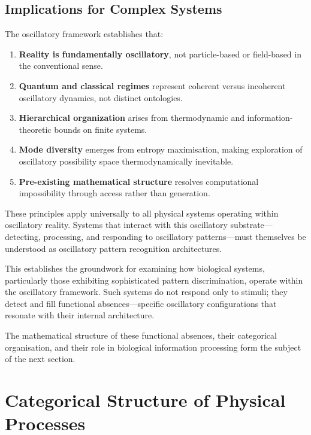 \documentclass[12pt,a4paper]{article}
\begin{document}
\subsection{Implications for Complex Systems}

The oscillatory framework establishes that:

\begin{enumerate}
\item \textbf{Reality is fundamentally oscillatory}, not particle-based or field-based in the conventional sense.

\item \textbf{Quantum and classical regimes} represent coherent versus incoherent oscillatory dynamics, not distinct ontologies.

\item \textbf{Hierarchical organization} arises from thermodynamic and information-theoretic bounds on finite systems.

\item \textbf{Mode diversity} emerges from entropy maximisation, making exploration of oscillatory possibility space thermodynamically inevitable.

\item \textbf{Pre-existing mathematical structure} resolves computational impossibility through access rather than generation.
\end{enumerate}

These principles apply universally to all physical systems operating within oscillatory reality. Systems that interact with this oscillatory substrate—detecting, processing, and responding to oscillatory patterns—must themselves be understood as oscillatory pattern recognition architectures.

This establishes the groundwork for examining how biological systems, particularly those exhibiting sophisticated pattern discrimination, operate within the oscillatory framework. Such systems do not respond only to stimuli; they detect and fill functional absences—specific oscillatory configurations that resonate with their internal architecture.

The mathematical structure of these functional absences, their categorical organisation, and their role in biological information processing form the subject of the next section.

\section{Categorical Structure of Physical Processes}
\end{document}
